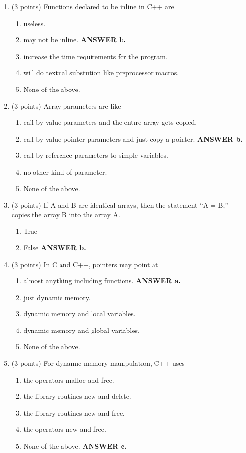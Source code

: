 \documentclass{article}
\newcommand{\ans}[1]{ \ifnum\showans=1 {\bf ANSWER #1.} \fi }
\begin{document}
\begin{enumerate}
\item (3 points) Functions declared to be inline in C++ are
  \begin{enumerate}
  \item useless.
  \item may not be inline.   \ans{b}
  \item increase the time requirements for the program.
  \item will do textual substution like preprocessor macros.
  \item None of the above.
  \end{enumerate}

\item (3 points) Array parameters are like
  \begin{enumerate}
  \item call by value parameters and the entire array gets copied.
  \item call by value pointer parameters and just copy a pointer.  \ans{b}
  \item call by reference parameters to simple variables.
  \item no other kind of parameter.
  \item None of the above.
  \end{enumerate}

\item (3 points) If A and B are identical arrays, then the statement
``A = B;'' copies the array B into the array A.
  \begin{enumerate}
  \item True
  \item False  \ans{b}
  \end{enumerate}

\item (3 points) In C and C++, pointers may point at
  \begin{enumerate} 
  \item almost anything including functions.  \ans{a}
  \item just dynamic memory.
  \item dynamic memory and local variables.
  \item dynamic memory and global variables.
  \item None of the above.
  \end{enumerate}

\item (3 points) For dynamic memory manipulation, C++ uses
  \begin{enumerate}
  \item the operators malloc and free.
  \item the library routines new and delete.
  \item the library routines new and free.
  \item the operators new and free.
  \item None of the above.  \ans{e}
  \end{enumerate}


\end{enumerate}
\end{document}
